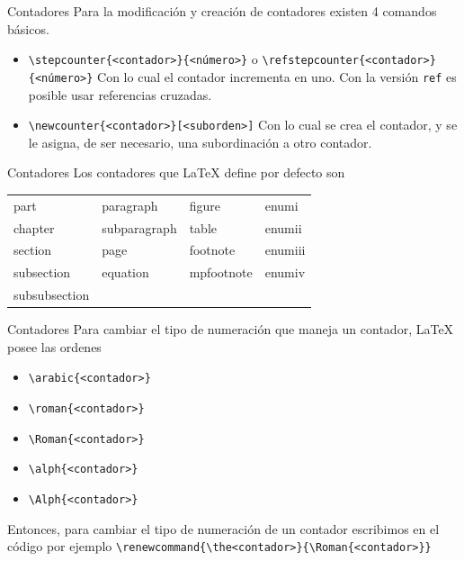 \documentclass[12pt,aspectratio=43]{beamer}
\newcommand{\lmr}{\fontfamily{lmr}\selectfont}
\begin{document}
\begin{frame}[fragile]{Contadores}{}
Para la modificación y creación de contadores existen 4 comandos básicos.

\begin{itemize}[<+->]
	\item \lstinline|\stepcounter{<contador>}{<número>}| o \lstinline|\refstepcounter{<contador>}{<número>}| Con lo cual el contador incrementa en uno. Con la versión \texttt{ref} es posible usar referencias cruzadas.
	\item \lstinline|\newcounter{<contador>}[<suborden>]| Con lo cual se crea el contador, y se le asigna, de ser necesario, una subordinación a otro contador.
\end{itemize}
\end{frame}

\begin{frame}{Contadores}{}
Los contadores que {\lmr\LaTeX} define por defecto son

\begin{center}
	\begin{tabular}{llll}
		part & paragraph & figure & enumi \\
		chapter & subparagraph & table & enumii \\
		section & page & footnote & enumiii \\
		subsection & equation & mpfootnote & enumiv \\
		subsubsection &  &  &  \\
	\end{tabular}
\end{center}
\end{frame}

\begin{frame}[fragile]{Contadores}
Para cambiar el tipo de numeración que maneja un contador, {\lmr\LaTeX} posee las ordenes

\begin{itemize}
	\item \lstinline|\arabic{<contador>}|
	\item \lstinline|\roman{<contador>}|
	\item \lstinline|\Roman{<contador>}|
	\item \lstinline|\alph{<contador>}|
	\item \lstinline|\Alph{<contador>}|
\end{itemize}\pause

Entonces, para cambiar el tipo de numeración de un contador escribimos en el código por ejemplo \lstinline|\renewcommand{\the<contador>}{\Roman{<contador>}}|
\end{frame}
\end{document}
